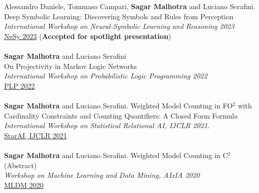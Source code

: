 \documentclass[10pt, a4paper]{article}
\newcommand{\years}[1]{\marginnote{\scriptsize #1}}
\begin{document}
\newpage
\years{2023}Alessandro Daniele, Tommaso Campari, \textbf{Sagar Malhotra} and Luciano Serafini. \\ Deep Symbolic Learning: Discovering Symbols and Rules from Perception \\  
\emph{International Workshop on Neural-Symbolic Learning and Reasoning 2023}\\
\href{https://sites.google.com/view/nesy2023/home/nesy2023-programme-outline?authuser=0}{NeSy 2023} (\textbf{Accepted for spotlight presentation})\\ \\
\years{2022}\textbf{Sagar Malhotra} and Luciano Serafini\\
On Projectivity in Markov Logic Networks\\ 
\emph{International Workshop on Probabilistic Logic Programming 2022}\\ \href{https://easychair.org/publications/preprint/2lTk}{ PLP 2022}\\ \\
\years{2021}\textbf{Sagar Malhotra} and Luciano Serafini. Weighted Model Counting in FO$^2$ with Cardinality Constraints and Counting Quantifiers: A Closed Form Formula\\ \emph{International Workshop on Statistical Relational AI, IJCLR 2021. }\\
\href{https://starai.cs.kuleuven.be/2021/}{ StarAI, IJCLR 2021} \\ \\ 
\years{{2020}}\textbf{Sagar Malhotra} and Luciano Serafini. Weighted Model Counting in C$^2$ (Abstract) \\
\emph{Workshop on Machine Learning and Data Mining, AIxIA 2020}\\
 \href{https://sites.google.com/view/mldm2020-workshop/program?authuser=0}{MLDM 2020}

\end{document}

